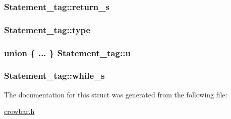\subsubsection[{return\+\_\+s}]{ Statement\+\_\+tag\+::return\+\_\+s}\label{struct_statement__tag_afe3a97a689d2ac59f84600f220cdad1e}
\hypertarget{struct_statement__tag_abe1b2488e3a8c4277078f8c1b7c86482}{}
\subsubsection[{type}]{ Statement\+\_\+tag\+::type}\label{struct_statement__tag_abe1b2488e3a8c4277078f8c1b7c86482}
\hypertarget{struct_statement__tag_a33748df145380d0099e0941d3c937265}{}
\subsubsection[{u}]{\setlength{\rightskip}{0pt plus 5cm}union \{ ... \}   Statement\+\_\+tag\+::u}\label{struct_statement__tag_a33748df145380d0099e0941d3c937265}
\hypertarget{struct_statement__tag_ad897c318f35e7476a81dcf1eb2275f89}{}
\subsubsection[{while\+\_\+s}]{ Statement\+\_\+tag\+::while\+\_\+s}\label{struct_statement__tag_ad897c318f35e7476a81dcf1eb2275f89}


The documentation for this struct was generated from the following file\+:\begin{DoxyCompactItemize}
\item 
\hyperlink{crowbar_8h}{crowbar.\+h}\end{DoxyCompactItemize}
